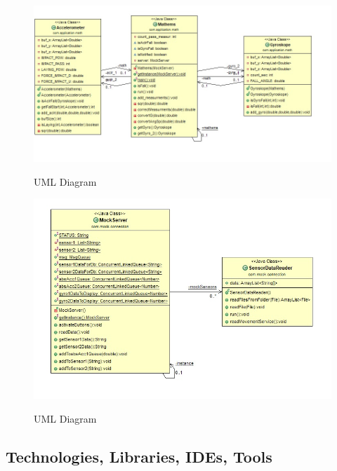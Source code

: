 \documentclass[hidelinks,conference,12pt]{IEEETran}
\begin{document}
\vskip 20cm
\FloatBarrier
\begin{figure}[!h]
	\centering
	\caption{UML Diagram}
	\includegraphics[scale=0.6]{images/UML2.jpeg}
	\label{img:UML2}
\end{figure}
\FloatBarrier
\FloatBarrier
\begin{figure}[!h]
	\centering
	\caption{UML Diagram}
	\includegraphics[scale=0.3]{images/UML3.jpeg}
	\label{img:UML3}
\end{figure}
\FloatBarrier

\subsection{Technologies, Libraries, IDEs, Tools}
\end{document}
